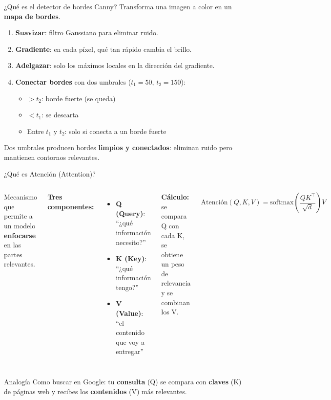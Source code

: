 \documentclass[aspectratio=169]{beamer}
\begin{document}
\begin{frame}{¿Qué es el detector de bordes Canny?}
Transforma una imagen a color en un \textbf{mapa de bordes}.
\begin{enumerate}
    \item \textbf{Suavizar}: filtro Gaussiano para eliminar ruido.
    \item \textbf{Gradiente}: en cada píxel, qué tan rápido cambia el brillo.
    \item \textbf{Adelgazar}: solo los máximos locales en la dirección del gradiente.
    \item \textbf{Conectar bordes} con dos umbrales ($t_1=50$, $t_2=150$):
    \begin{itemize}
        \item $> t_2$: borde fuerte (se queda)
        \item $< t_1$: se descarta
        \item Entre $t_1$ y $t_2$: solo si conecta a un borde fuerte
    \end{itemize}
\end{enumerate}
\vspace{0.3em}
{\small Dos umbrales producen bordes \textbf{limpios y conectados}: eliminan ruido pero mantienen contornos relevantes.}
\end{frame}

\begin{frame}{¿Qué es Atención (Attention)?}
\begin{columns}[T]
Mecanismo que permite a un modelo \textbf{enfocarse} en las partes relevantes.

\textbf{Tres componentes:}
\begin{itemize}
    \item \textbf{Q (Query)}: ``¿qué información necesito?''
    \item \textbf{K (Key)}: ``¿qué información tengo?''
    \item \textbf{V (Value)}: ``el contenido que voy a entregar''
\end{itemize}
\vspace{0.3em}
\textbf{Cálculo:} se compara Q con cada K, se obtiene un peso de relevancia y se combinan los V.

\begin{equation*}
\text{Atención}(Q,K,V) = \text{softmax}\!\left(\frac{QK^\top}{\sqrt{d}}\right)V
\end{equation*}
\end{columns}
\vspace{0.3em}
\begin{block}{Analogía}
Como buscar en Google: tu \textbf{consulta} (Q) se compara con \textbf{claves} (K) de páginas web y recibes los \textbf{contenidos} (V) más relevantes.
\end{block}
\end{frame}
\end{document}
